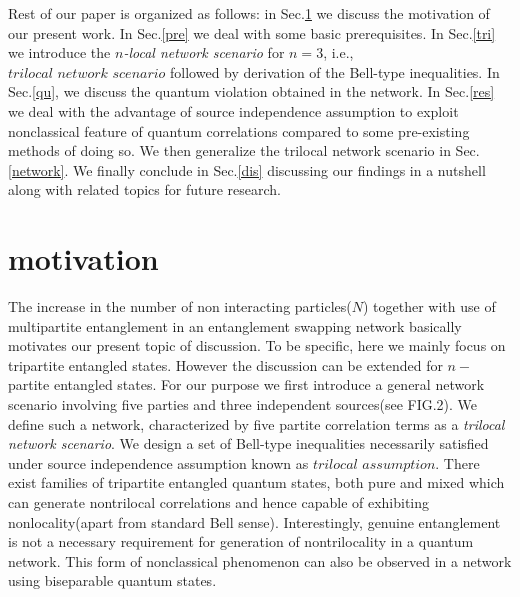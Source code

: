\documentclass[pra,10pt,twocolumn,superscriptaddress,floatfix,showpacs]{revtex4-1}
\begin{document}
Rest of our paper is organized as follows:  in Sec.\ref{mot} we discuss the motivation of our present work. In Sec.\ref{pre} we deal with some basic prerequisites. In Sec.\ref{tri} we introduce the \textit{$n$-local network scenario} for $n$$=$$3$, i.e., $\textit{trilocal network scenario}$ followed by derivation of the Bell-type inequalities. In Sec.\ref{qu}, we discuss the quantum violation obtained in the network. In Sec.\ref{res} we deal with the advantage of source independence assumption to exploit nonclassical feature of quantum correlations compared to some pre-existing methods of doing so. We then generalize the trilocal network scenario in Sec.\ref{network}. We finally conclude in Sec.\ref{dis} discussing our findings in a nutshell along with related topics for future research.
\section{motivation}\label{mot}
The increase in the number of non interacting particles($N$) together with use of multipartite entanglement in an entanglement swapping network basically motivates our present topic of discussion. To be specific, here we mainly focus on tripartite entangled states. However the discussion can be extended for $n-$ partite entangled states. For our purpose we first introduce a general network scenario involving five parties and three independent sources(see FIG.2). We define such a network, characterized by five partite correlation terms as a \textit{trilocal network scenario}. We design a set of Bell-type inequalities necessarily satisfied under source independence assumption known as $\textit{trilocal assumption}$. There exist families of tripartite entangled quantum states, both pure and mixed which can generate nontrilocal correlations and hence capable of exhibiting nonlocality(apart from standard Bell sense). Interestingly, genuine entanglement is not a necessary requirement for generation of nontrilocality in a quantum network. This form of nonclassical phenomenon can also be observed in a network using biseparable quantum states.  \\
\end{document}
